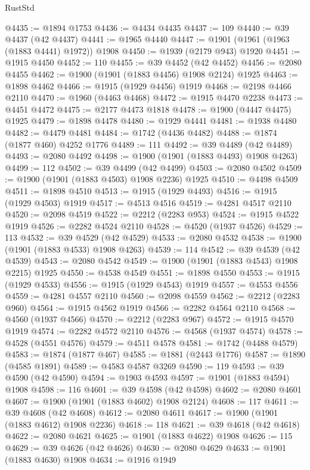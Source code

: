 \begin{lexlean}{RustStd}
\begin{coremodule}
{\begin{coremodule}
{{{{{{{{{{{{{{{{{{{{{{{{{{{{{{{{{{{{{{{{{{{@4435 := @1894 @1753
@4436 := @4434 @4435
@4437 := 109
@4440 := @39 @4437 (@42 @4437)
@4441 := @1965 @4440
@4447 := @1901 (@1961 (@1963 (@1883 @4441) @1972)) @1908
@4450 := @1939 (@2179 @943) @1920
@4451 := @1915 @4450
@4452 := 110
@4455 := @39 @4452 (@42 @4452)
@4456 := @2080 @4455
@4462 := @1900 (@1901 (@1883 @4456) @1908 @2124) @1925
@4463 := @1898 @4462
@4466 := @1915 (@1929 @4456) @1919
@4468 := @2198 @4466 @2110
@4470 := @1960 (@4463 @4468)
@4472 := @1915 @4470 @2238
@4473 := @4451 @4472
@4475 := @2177 @4473 @1818
@4478 := @1900 (@4447 @4475) @1925
@4479 := @1898 @4478
@4480 := @1929 @4441
@4481 := @1938 @4480
@4482 := @4479 @4481
@4484 := @1742 (@4436 @4482)
@4488 := @1874 (@1877 @460) @4252 @1776
@4489 := 111
@4492 := @39 @4489 (@42 @4489)
@4493 := @2080 @4492
@4498 := @1900 (@1901 (@1883 @4493) @1908 @4263)
@4499 := 112
@4502 := @39 @4499 (@42 @4499)
@4503 := @2080 @4502
@4509 := @1900 (@1901 (@1883 @4503) @1908 @2236) @1925
@4510 := @4498 @4509
@4511 := @1898 @4510
@4513 := @1915 (@1929 @4493)
@4516 := @1915 (@1929 @4503) @1919
@4517 := @4513 @4516
@4519 := @4281 @4517 @2110
@4520 := @2098 @4519
@4522 := @2212 (@2283 @953)
@4524 := @1915 @4522 @1919
@4526 := @2282 @4524 @2110
@4528 := @4520 (@1937 @4526)
@4529 := 113
@4532 := @39 @4529 (@42 @4529)
@4533 := @2080 @4532
@4538 := @1900 (@1901 (@1883 @4533) @1908 @4263)
@4539 := 114
@4542 := @39 @4539 (@42 @4539)
@4543 := @2080 @4542
@4549 := @1900 (@1901 (@1883 @4543) @1908 @2215) @1925
@4550 := @4538 @4549
@4551 := @1898 @4550
@4553 := @1915 (@1929 @4533)
@4556 := @1915 (@1929 @4543) @1919
@4557 := @4553 @4556
@4559 := @4281 @4557 @2110
@4560 := @2098 @4559
@4562 := @2212 (@2283 @960)
@4564 := @1915 @4562 @1919
@4566 := @2282 @4564 @2110
@4568 := @4560 (@1937 @4566)
@4570 := @2212 (@2283 @967)
@4572 := @1915 @4570 @1919
@4574 := @2282 @4572 @2110
@4576 := @4568 (@1937 @4574)
@4578 := @4528 (@4551 @4576)
@4579 := @4511 @4578
@4581 := @1742 (@4488 @4579)
@4583 := @1874 (@1877 @467)
@4585 := @1881 (@2443 @1776)
@4587 := @1890 (@4585 @1891)
@4589 := @4583 @4587 @3269
@4590 := 119
@4593 := @39 @4590 (@42 @4590)
@4594 := @1903 @4593
@4597 := @1901 (@1883 @4594) @1908
@4598 := 116
@4601 := @39 @4598 (@42 @4598)
@4602 := @2080 @4601
@4607 := @1900 (@1901 (@1883 @4602) @1908 @2124)
@4608 := 117
@4611 := @39 @4608 (@42 @4608)
@4612 := @2080 @4611
@4617 := @1900 (@1901 (@1883 @4612) @1908 @2236)
@4618 := 118
@4621 := @39 @4618 (@42 @4618)
@4622 := @2080 @4621
@4625 := @1901 (@1883 @4622) @1908
@4626 := 115
@4629 := @39 @4626 (@42 @4626)
@4630 := @2080 @4629
@4633 := @1901 (@1883 @4630) @1908
@4634 := @1916 @1949
}}}}}}}}}}}}}}}}}}}}}}}}}}}}}}}}}}}}}}}}}}}
\end{coremodule}}
\end{coremodule}
\end{lexlean}
